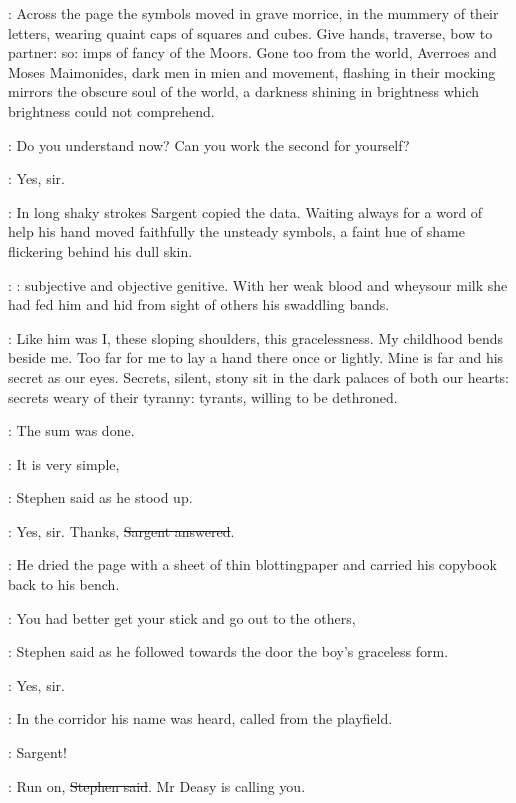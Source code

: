 \StephenInt:
Across the page the symbols moved in grave morrice,
in the mummery of their letters,
wearing quaint caps of squares and cubes.
Give hands, traverse, bow to partner:
so:
imps of fancy of the Moors.
Gone too from the world,
Averroes and Moses Maimonides,
dark men in mien and movement,
flashing in their mocking mirrors the obscure soul of the world,
a darkness shining in brightness
which brightness could not comprehend.

\Stephen:
Do you understand now?
Can you work the second for yourself?

\sargent:
Yes, sir.

:
In long shaky strokes Sargent copied the data.
Waiting always for a word of help
his hand moved faithfully the unsteady symbols,
a faint hue of shame flickering behind his dull skin.

\StephenInt:
: subjective and objective genitive.
With her weak blood and wheysour milk
she had fed him and hid from sight of others his swaddling bands.

\StephenInt:
Like him was I, these sloping shoulders, this gracelessness.
My childhood bends beside me.
Too far for me to lay a hand there once or lightly.
Mine is far and his secret as our eyes.
Secrets, silent, stony sit in the dark palaces of both our hearts:
secrets weary of their tyranny:
tyrants, willing to be dethroned.

:
The sum was done.

\Stephen:
It is very simple,

:
Stephen said as he stood up.

\sargent:
Yes, sir.
Thanks, \sout{Sargent answered}.

:
He dried the page with a sheet of thin blottingpaper
and carried his copybook back to his bench.

\Stephen:
You had better get your stick and go out to the others,

:
Stephen said as he followed towards the door the boy's graceless form.

\sargent:
Yes, sir.

:
In the corridor his name was heard, called from the playfield.

\deasy:
Sargent!

\Stephen:
Run on, \sout{Stephen said}.
Mr Deasy is calling you.
